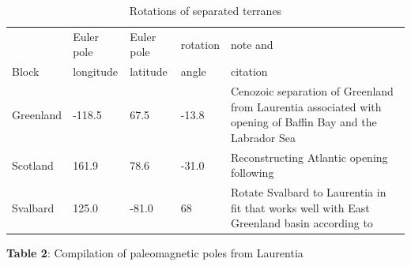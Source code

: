 \documentclass[11pt,letterpaper]{article}
\begin{document}

\footnotesize


\begin{table}[hbt]
\caption{Rotations of separated terranes}
{\scriptsize
\begin{tabular}{|l|l|l|l|p{2 in}|}
  \hline
& Euler pole & Euler pole & rotation & note and \\
Block & longitude & latitude & angle & citation \\
\hline
Greenland & -118.5 & 67.5 & -13.8 & Cenozoic separation of Greenland from Laurentia associated with opening of Baffin Bay and the Labrador Sea \citep{Roest1989a} \\
\hline
Scotland & 161.9 & 78.6 & -31.0 & Reconstructing Atlantic opening following \cite{Torsvik2017a} \\
\hline
Svalbard & 125.0 & -81.0 & 68 & Rotate Svalbard to Laurentia in fit that works well with East Greenland basin according to \cite{Maloof2006a}\\
\hline
\end{tabular}
}
\label{tab:terrane_rotations}
\end{table}

\newpage

\textbf{Table 2}: Compilation of paleomagnetic poles from Laurentia
{\scriptsize
\begin{landscape}

\end{landscape}
}
\end{document}
